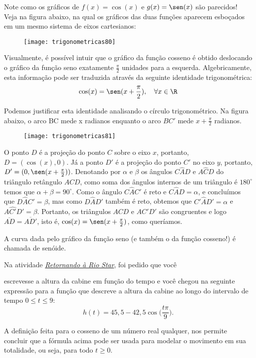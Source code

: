 Note como os gráficos de $f(x) = \cos(x)$ e $g(x) = \sen(x)$ são parecidos! Veja na figura abaixo, na qual os gráficos das duas funções aparecem esboçados em um mesmo sistema de eixos cartesianos:

\begin{figure}[H]
\centering

\texttt{[image: trigonometricas80]}
\end{figure}

Visualmente, é possível intuir que o gráfico da função cosseno é obtido deslocando o gráfico da função seno exatamente $\frac{\pi}{2}$ unidades para a esquerda. Algebricamente, esta informação pode ser traduzida através da seguinte identidade trigonométrica:
\begin{equation*}
\cos(x)=\sen(x+\frac{\pi}{2}),\quad\forall x\in\R
\end{equation*}

Podemos justificar esta identidade analisando o círculo trigonométrico. Na figura abaixo, o arco BC mede x radianos enquanto o arco $BC'$ mede $x + \frac{\pi}{2}$ radianos. 

\begin{figure}[H]
\centering

\texttt{[image: trigonometricas81]}
\end{figure}

O ponto $D$ é a projeção do ponto $C$ sobre o eixo $x$, portanto, $D = (\cos(x), 0)$. Já a ponto $D'$ é a projeção do ponto $C'$ no eixo $y$, portanto, $D' = (0,\sen(x +  \frac{\pi}{2}))$. Denotando por $\alpha$ e $\beta$ os ângulos $C\hat{A}D$ e $A\hat{C}D$ do triângulo retângulo $ACD$, como soma dos ângulos internos de um triângulo é $180^{\circ}$ temos que $\alpha+\beta=90^{\circ}$. Como o ângulo $C\hat{A}C'$ é reto e $C\hat{A}D=\alpha$, e concluímos que $D\hat{A}C'=\beta$, mas como $D\hat{A}D'$ também é reto, obtemos que $C'\hat{A}D'=\alpha$ e $A\hat{C'}D'=\beta$. Portanto, os triângulos $ACD$ e $AC'D'$ são congruentes e logo $\overline{AD}=\overline{AD'}$, isto é, $\cos(x) = \sen(x +  \frac{\pi}{2})$, como queríamos.


A curva dada pelo gráfico da função seno (e também o da função cosseno!) é chamada de senóide. 


\begin{observation}
Na atividade \hyperref[trig-ativ15]{\textit{Retornando à Rio Star}}, foi pedido que você


escrevesse a altura da cabine em função do tempo e você chegou na seguinte expressão para a função que descreve a altura da cabine ao longo do intervalo de tempo $0\leq t\leq 9$:
\begin{equation*}
h(t)=45{,}5-42{,}5\cos\bigg(\frac{t\pi}{9}\bigg).
\end{equation*}

A definição feita para o cosseno de um número real qualquer, nos permite concluir que a fórmula acima pode ser usada para modelar o movimento em sua totalidade, ou seja, para todo $t\geq0$.

\end{observation}

